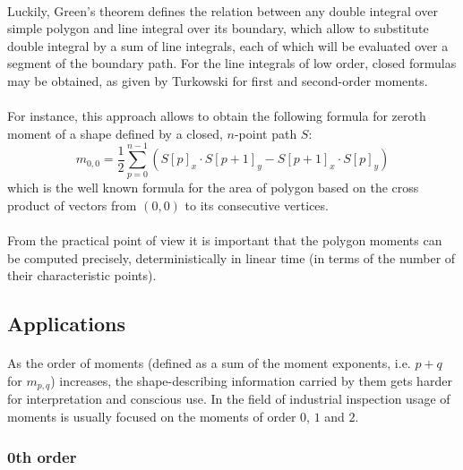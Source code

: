 \paragraph*{}
Luckily, Green's theorem defines the relation between any double integral over simple polygon and line integral over its boundary, which allow to substitute double integral by a sum of line integrals, each of which will be evaluated over a segment of the boundary path. For the line integrals of low order, closed formulas may be obtained, as given\cite{Turkowski97} by Turkowski for first and second-order moments.

\paragraph*{}
For instance, this approach allows to obtain the following formula for zeroth moment of a shape defined by a closed, $n$-point path $S$:
\[
	m_{0,0} = \frac{1}{2} \sum_{p = 0}^{n-1} (S[p]_x \cdot S[p+1]_y  - S[p+1]_x \cdot S[p]_y)
\]
which is the well known formula for the area of polygon based on the cross product of vectors from $(0,0)$ to its consecutive vertices. 

\paragraph*{}
From the practical point of view it is important that the polygon moments can be computed precisely, deterministically in linear time (in terms of the number of their characteristic points).

\subsection{Applications}

\paragraph*{}
As the order of moments (defined as a sum of the moment exponents, i.e. $p+q$ for $m_{p,q}$) increases, the shape-describing information carried by them gets harder for interpretation and conscious use. In the field of industrial inspection usage of moments is usually focused on the moments of order $0$, $1$ and $2$.

\subsubsection{0th order}

